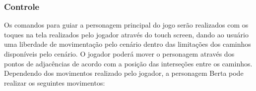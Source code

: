 \documentclass[10pt, conference, compsocconf]{IEEEtran}
\begin{document}

\subsubsection{Controle} \label{GDD}
Os comandos para guiar a personagem principal do jogo serão realizados com os toques na tela realizados pelo jogador através do touch screen, dando ao usuário uma liberdade de movimentação pelo cenário dentro das limitações dos caminhos disponíveis pelo cenário. O jogador poderá mover o personagem através dos pontos de adjacências de acordo com a posição das interseções entre os caminhos.
Dependendo dos movimentos realizado pelo jogador, a personagem Berta pode realizar os seguintes movimentos:

\end{document}
